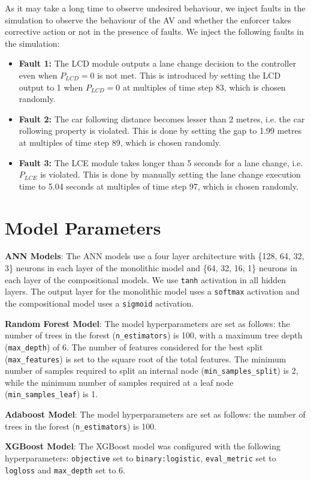 As it may take a long time to observe undesired behaviour, we inject faults in the simulation to observe the behaviour of the AV  and whether the enforcer takes corrective action or not in the presence of faults. We inject the following faults in the simulation:

\begin{itemize}
    \item \textbf{Fault 1:} The LCD module outputs a lane change decision to the controller even when $P_{LCD} = 0$ is not met. This is introduced by setting the LCD output to 1 when $P_{LCD} = 0$ at multiples of time step 83, which is chosen randomly.
    
    \item \textbf{Fault 2:} The car following distance becomes lesser than 2 metres, i.e. the car rollowing property is violated. This is done by setting the gap to 1.99 metres at multiples of time step 89, which is chosen randomly.
    
    \item \textbf{Fault 3:} The LCE module takes longer than 5 seconds for a lane change, i.e. $P_{LCE}$ is violated. This is done by manually setting the lane change execution time to 5.04 seconds at multiples of time step 97, which is chosen randomly.
\end{itemize}



\section{Model Parameters}\label{sec:appendix_model_params}

\textbf{ANN Models}: The ANN models use a four layer architecture with \{128, 64, 32, 3\} neurons in each layer of the monolithic model and \{64, 32, 16, 1\} neurons in each layer of the compositional models. We use \texttt{tanh} activation in all hidden layers. The output layer for the monolithic model uses a \texttt{softmax} activation and the compositional model uses a \texttt{sigmoid} activation.

\textbf{Random Forest Model}: The model hyperparameters are set as follows: the number of trees in the forest (\texttt{n\_estimators}) is 100, with a maximum tree depth (\texttt{max\_depth}) of 6. The number of features considered for the best split (\texttt{max\_features}) is set to the square root of the total features. The minimum number of samples required to split an internal node (\texttt{min\_samples\_split}) is 2, while the minimum number of samples required at a leaf node (\texttt{min\_samples\_leaf}) is 1. 

\textbf{Adaboost Model}: The model hyperparameters are set as follows: the number of trees in the forest (\texttt{n\_estimators}) is 100.

\textbf{XGBoost Model}: The XGBoost model was configured with the following hyperparameters: \texttt{objective} set to \texttt{binary:logistic}, \texttt{eval\_metric} set to \texttt{logloss} and  \texttt{max\_depth} set to 6.
